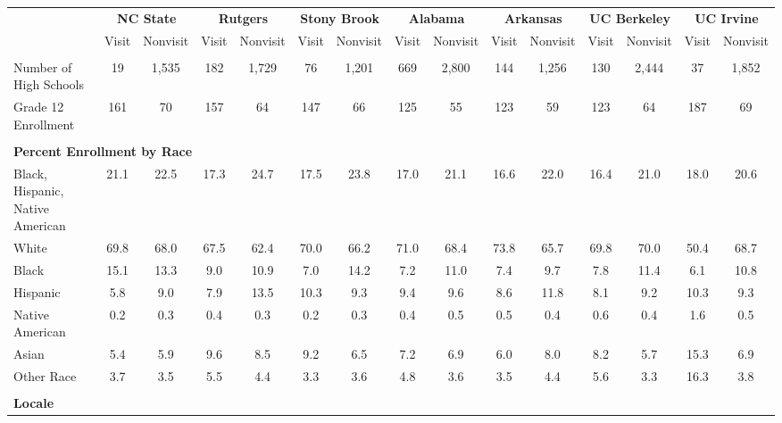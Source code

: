 \begin{tabular*}{\linewidth}{@{\extracolsep{\fill} } lcccccccccccccc}%
&\multicolumn{2}{c}{\bfseries NC State}&\multicolumn{2}{c}{\bfseries Rutgers}&\multicolumn{2}{c}{\bfseries Stony Brook}&\multicolumn{2}{c}{\bfseries Alabama}&\multicolumn{2}{c}{\bfseries Arkansas}&\multicolumn{2}{c}{\bfseries UC Berkeley}&\multicolumn{2}{c}{\bfseries UC Irvine}\\%
&Visit&\multicolumn{1}{l}{Nonvisit}&Visit&\multicolumn{1}{l}{Nonvisit}&Visit&\multicolumn{1}{l}{Nonvisit}&Visit&\multicolumn{1}{l}{Nonvisit}&Visit&\multicolumn{1}{l}{Nonvisit}&Visit&\multicolumn{1}{l}{Nonvisit}&Visit&\multicolumn{1}{l}{Nonvisit}\\%
\hline%
&&&&&&&&&&&&&&\\%
\hspace{0cm}Number of High Schools&19&1,535&182&1,729&76&1,201&669&2,800&144&1,256&130&2,444&37&1,852\\%
\hspace{0cm}Grade 12 Enrollment&161&70&157&64&147&66&125&55&123&59&123&64&187&69\\%
&&&&&&&&&&&&&&\\%
\multicolumn{15}{l}{\bfseries Percent Enrollment by Race}\\%
\hspace{0.2cm}Black, Hispanic, Native American&21.1&22.5&17.3&24.7&17.5&23.8&17.0&21.1&16.6&22.0&16.4&21.0&18.0&20.6\\%
\hspace{0.2cm}White&69.8&68.0&67.5&62.4&70.0&66.2&71.0&68.4&73.8&65.7&69.8&70.0&50.4&68.7\\%
\hspace{0.2cm}Black&15.1&13.3&9.0&10.9&7.0&14.2&7.2&11.0&7.4&9.7&7.8&11.4&6.1&10.8\\%
\hspace{0.2cm}Hispanic&5.8&9.0&7.9&13.5&10.3&9.3&9.4&9.6&8.6&11.8&8.1&9.2&10.3&9.3\\%
\hspace{0.2cm}Native American&0.2&0.3&0.4&0.3&0.2&0.3&0.4&0.5&0.5&0.4&0.6&0.4&1.6&0.5\\%
\hspace{0.2cm}Asian&5.4&5.9&9.6&8.5&9.2&6.5&7.2&6.9&6.0&8.0&8.2&5.7&15.3&6.9\\%
\hspace{0.2cm}Other Race&3.7&3.5&5.5&4.4&3.3&3.6&4.8&3.6&3.5&4.4&5.6&3.3&16.3&3.8\\%
&&&&&&&&&&&&&&\\%
\multicolumn{15}{l}{\bfseries Locale}\\%

\end{tabular*}
